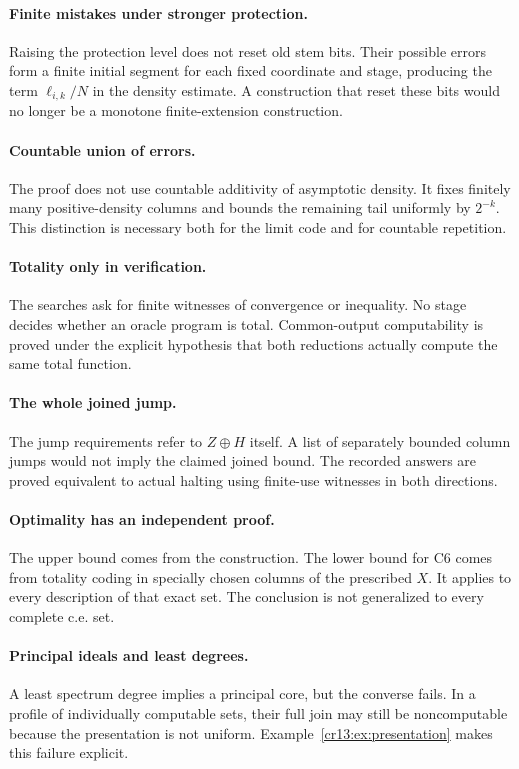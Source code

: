 \documentclass[11pt,letterpaper]{article}
\theoremstyle{definition}
\theoremstyle{remark}\newtheorem{remark}[theorem]{Remark}
\numberwithin{equation}{section}
\begin{document}
\paragraph{Finite mistakes under stronger protection.}
Raising the protection level does not reset old stem bits. Their possible errors form a finite initial segment for each fixed coordinate and stage, producing the term $\ell_{i,k}/N$ in the density estimate. A construction that reset these bits would no longer be a monotone finite-extension construction.

\paragraph{Countable union of errors.}
The proof does not use countable additivity of asymptotic density. It fixes finitely many positive-density columns and bounds the remaining tail uniformly by $2^{-k}$. This distinction is necessary both for the limit code and for countable repetition.

\paragraph{Totality only in verification.}
The searches ask for finite witnesses of convergence or inequality. No stage decides whether an oracle program is total. Common-output computability is proved under the explicit hypothesis that both reductions actually compute the same total function.

\paragraph{The whole joined jump.}
The jump requirements refer to $Z\oplus H$ itself. A list of separately bounded column jumps would not imply the claimed joined bound. The recorded answers are proved equivalent to actual halting using finite-use witnesses in both directions.

\paragraph{Optimality has an independent proof.}
The upper bound comes from the construction. The lower bound for C6 comes from totality coding in specially chosen columns of the prescribed $X$. It applies to every description of that exact set. The conclusion is not generalized to every complete c.e. set.

\paragraph{Principal ideals and least degrees.}
A least spectrum degree implies a principal core, but the converse fails. In a profile of individually computable sets, their full join may still be noncomputable because the presentation is not uniform. Example~\ref{cr13:ex:presentation} makes this failure explicit.
\end{document}
